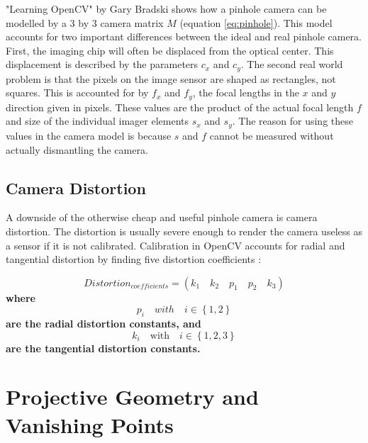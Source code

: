 "Learning OpenCV" by Gary Bradski\cite{oreillycv} shows how a pinhole camera can be modelled by a 3 by 3 camera matrix $M$ (equation \ref{eq:pinhole}). This model accounts for two important differences between the ideal and real pinhole camera. First, the imaging chip will often be displaced from the optical center. This displacement is described by the parameters $c_x$ and $c_y$. The second real world problem is that the pixels on the image sensor are shaped as rectangles, not squares. This is accounted for by $f_x$ and $f_y$, the focal lengths in the $x$ and $y$ direction given in pixels. These values are the product of the actual focal length $f$ and size of the individual imager elements $s_x$ and $s_y$. The reason for using these values in the camera model is because $s$ and $f$ cannot be measured without actually dismantling the camera\cite{oreillycv}.

\subsection{Camera Distortion}

A downside of the otherwise cheap and useful pinhole camera is camera distortion. The distortion is usually severe enough to render the camera useless as a sensor if it is not calibrated. Calibration in OpenCV accounts for radial and tangential distortion by finding five distortion coefficients \cite{3dCalib}:

\begin{equation*}
Distortion_{coefficients} = (k_1 \quad k_2 \quad p_1 \quad p_2 \quad k_3)
\end{equation*}
\textbf{where} 
\begin{equation*}
p_i \quad with \quad i \in \left\{1, 2\right\}
\end{equation*}
\textbf{are the radial distortion constants, and}
\begin{equation*}
k_i \quad \textrm{with} \quad i \in \left\{1, 2, 3\right\}  
\end{equation*}
\textbf{are the tangential distortion constants.} 

\section{Projective Geometry and Vanishing Points}

